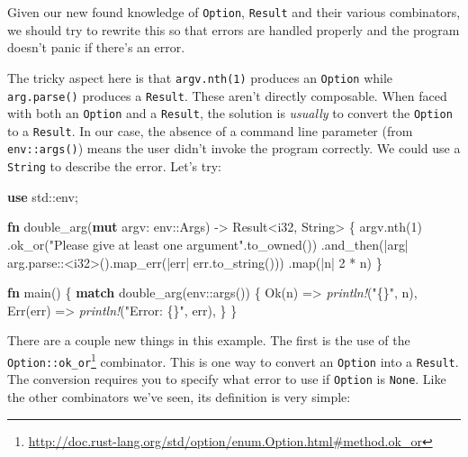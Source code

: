 \documentclass[a4paper,]{book}
\renewcommand*{\hypertarget}[3][\ar]{%
  \def\ar{#2}%
  \label{#1}%
  #3}
\newenvironment{Shaded}{\begin{snugshade}}{\end{snugshade}}
\newcommand{\KeywordTok}[1]{\textcolor[rgb]{0.13,0.29,0.53}{\textbf{{#1}}}}
\newcommand{\DataTypeTok}[1]{\textcolor[rgb]{0.13,0.29,0.53}{{#1}}}
\newcommand{\DecValTok}[1]{\textcolor[rgb]{0.00,0.00,0.81}{{#1}}}
\newcommand{\ConstantTok}[1]{\textcolor[rgb]{0.00,0.00,0.00}{{#1}}}
\newcommand{\StringTok}[1]{\textcolor[rgb]{0.31,0.60,0.02}{{#1}}}
\newcommand{\PreprocessorTok}[1]{\textcolor[rgb]{0.56,0.35,0.01}{\textit{{#1}}}}
\newcommand{\NormalTok}[1]{{#1}}
\renewcommand{\href}[2]{#2\footnote{\url{#1}}}
\begin{document}
Given our new found knowledge of \texttt{Option}, \texttt{Result} and
their various combinators, we should try to rewrite this so that errors
are handled properly and the program doesn't panic if there's an error.

The tricky aspect here is that \texttt{argv.nth(1)} produces an
\texttt{Option} while \texttt{arg.parse()} produces a \texttt{Result}.
These aren't directly composable. When faced with both an
\texttt{Option} and a \texttt{Result}, the solution is \emph{usually} to
convert the \texttt{Option} to a \texttt{Result}. In our case, the
absence of a command line parameter (from \texttt{env::args()}) means
the user didn't invoke the program correctly. We could use a
\texttt{String} to describe the error. Let's try:

\protect\hypertarget{code-error-double-string}{}{}

\begin{Shaded}
\begin{Highlighting}[]
\KeywordTok{use} \NormalTok{std::env;}

\KeywordTok{fn} \NormalTok{double_arg(}\KeywordTok{mut} \NormalTok{argv: env::Args) -> }\DataTypeTok{Result}\NormalTok{<}\DataTypeTok{i32}\NormalTok{, }\DataTypeTok{String}\NormalTok{> \{}
    \NormalTok{argv.nth(}\DecValTok{1}\NormalTok{)}
        \NormalTok{.ok_or(}\StringTok{"Please give at least one argument"}\NormalTok{.to_owned())}
        \NormalTok{.and_then(|arg| arg.parse::<}\DataTypeTok{i32}\NormalTok{>().map_err(|err| err.to_string()))}
        \NormalTok{.map(|n| }\DecValTok{2} \NormalTok{* n)}
\NormalTok{\}}

\KeywordTok{fn} \NormalTok{main() \{}
    \KeywordTok{match} \NormalTok{double_arg(env::args()) \{}
        \ConstantTok{Ok}\NormalTok{(n) => }\PreprocessorTok{println!}\NormalTok{(}\StringTok{"\{\}"}\NormalTok{, n),}
        \ConstantTok{Err}\NormalTok{(err) => }\PreprocessorTok{println!}\NormalTok{(}\StringTok{"Error: \{\}"}\NormalTok{, err),}
    \NormalTok{\}}
\NormalTok{\}}
\end{Highlighting}
\end{Shaded}

There are a couple new things in this example. The first is the use of
the
\href{http://doc.rust-lang.org/std/option/enum.Option.html\#method.ok_or}{\texttt{Option::ok\_or}}
combinator. This is one way to convert an \texttt{Option} into a
\texttt{Result}. The conversion requires you to specify what error to
use if \texttt{Option} is \texttt{None}. Like the other combinators
we've seen, its definition is very simple:
\end{document}
